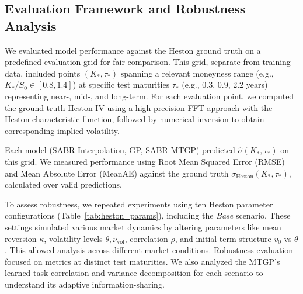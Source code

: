 \documentclass[preprint,12pt]{elsarticle}
\begin{document}
\subsection{Evaluation Framework and Robustness Analysis}

We evaluated model performance against the Heston ground truth on a predefined evaluation grid for fair comparison. This grid, separate from training data, included points $(K_\ast, \tau_\ast)$ spanning a relevant moneyness range (e.g., $K_\ast/S_0 \in [0.8, 1.4]$) at specific test maturities $\tau_\ast$ (e.g., 0.3, 0.9, 2.2 years) representing near-, mid-, and long-term. For each evaluation point, we computed the ground truth Heston IV using a high-precision FFT approach with the Heston characteristic function, followed by numerical inversion to obtain corresponding implied volatility. 

Each model (SABR Interpolation, GP, SABR-MTGP) predicted $\hat{\sigma}(K_\ast, \tau_\ast)$ on this grid. We measured performance using Root Mean Squared Error (RMSE) and Mean Absolute Error (MeanAE) against the ground truth $\sigma_{\text{Heston}}(K_\ast, \tau_\ast)$, calculated over valid predictions.

To assess robustness, we repeated experiments using ten Heston parameter configurations (Table~\ref{tab:heston_params}), including the \textit{Base} scenario. These settings simulated various market dynamics by altering parameters like mean reversion $\kappa$, volatility levels $\theta, \nu_{\text{vol}}$, correlation $\rho$, and initial term structure $v_0$ vs $\theta$. This allowed analysis across different market conditions. Robustness evaluation focused on metrics at distinct test maturities. We also analyzed the MTGP's learned task correlation and variance decomposition for each scenario to understand its adaptive information-sharing.
\end{document}
